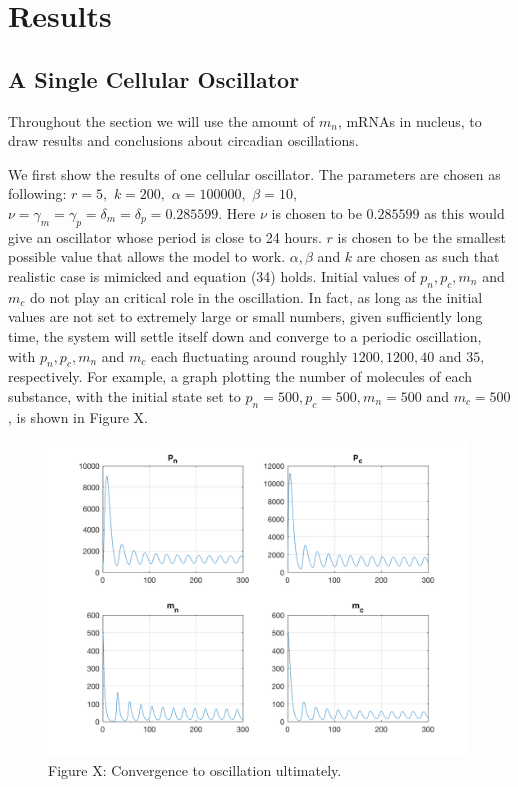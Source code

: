 \documentclass[12pt]{article}
\renewcommand{\(}{\left (}
\renewcommand{\)}{\right )}
\begin{document}
\newpage

\section{Results}
\subsection{A Single Cellular Oscillator}
\hspace{5mm} Throughout the section we will use the amount of $m_n$, mRNAs in nucleus, to draw results and conclusions about circadian oscillations.

We first show the results of one cellular oscillator. The parameters are chosen as following: $r = 5,$ $k= 200,$ $\alpha = 100000,$ $\beta = 10,$ $\nu = \gamma_m = \gamma_p = \delta_m =\delta_p = 0.285599.$ Here $\nu$ is chosen to be $0.285599$ as this would give an oscillator whose period is close to 24 hours. $r$ is chosen to be the smallest possible value that allows the model to work. $\alpha, \beta$ and $k$ are chosen as such that realistic case is mimicked and equation (34) holds. Initial values of $p_n, p_c, m_n$ and $m_c$ do not play an critical role in the oscillation. In fact, as long as the initial values are not set to extremely large or small numbers, given sufficiently long time, the system will settle itself down and converge to a periodic oscillation, with $p_n, p_c, m_n$ and $m_c$ each fluctuating around roughly $1200, 1200, 40$ and $35,$ respectively. For example, a graph plotting the number of molecules of each substance, with the initial state set to $p_n = 500, p_c = 500, m_n = 500$ and $m_c = 500$, is shown in Figure X.
\begin{figure}[h]
    \centering
	\begin{minipage}{0.5\textwidth}
		\centering
		\includegraphics[width=0.99\textwidth]{single_cell_show_convergence.png}
		\caption*{\small Figure X: Convergence to oscillation ultimately.}
	\end{minipage}

\end{figure}
\end{document}
